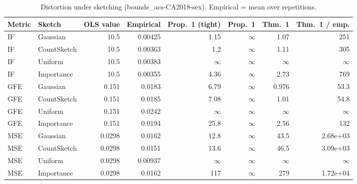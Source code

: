\begin{table}[t]
\centering
\small
\begin{tabular}{llrrrrrr}
\toprule
Metric & Sketch & OLS value & Empirical & Prop.~1 (tight) & Prop.~1 & Thm.~1 & Thm.~1 / emp. \\
\midrule
IF & Gaussian & 10.5 & 0.00425 & 1.15 & $\infty$ & 1.07 & 251 \\
IF & CountSketch & 10.5 & 0.00363 & 1.2 & $\infty$ & 1.11 & 305 \\
IF & Uniform & 10.5 & 0.00383 & $\infty$ & $\infty$ & $\infty$ & $\infty$ \\
IF & Importance & 10.5 & 0.00355 & 4.36 & $\infty$ & 2.73 & 769 \\
\midrule
GFE & Gaussian & 0.151 & 0.0183 & 6.79 & $\infty$ & 0.976 & 53.3 \\
GFE & CountSketch & 0.151 & 0.0185 & 7.08 & $\infty$ & 1.01 & 54.8 \\
GFE & Uniform & 0.151 & 0.0242 & $\infty$ & $\infty$ & $\infty$ & $\infty$ \\
GFE & Importance & 0.151 & 0.0194 & 25.8 & $\infty$ & 2.56 & 132 \\
\midrule
MSE & Gaussian & 0.0298 & 0.0162 & 12.8 & $\infty$ & 43.5 & 2.68e+03 \\
MSE & CountSketch & 0.0298 & 0.0151 & 13.6 & $\infty$ & 46.5 & 3.09e+03 \\
MSE & Uniform & 0.0298 & 0.00937 & $\infty$ & $\infty$ & $\infty$ & $\infty$ \\
MSE & Importance & 0.0298 & 0.0162 & 117 & $\infty$ & 279 & 1.72e+04 \\
\bottomrule
\end{tabular}
\caption{Distortion under sketching (bounds_acs-CA2018-sex). Empirical = mean over repetitions.}
\label{tab:bounds_acs-CA2018-sex}
\end{table}